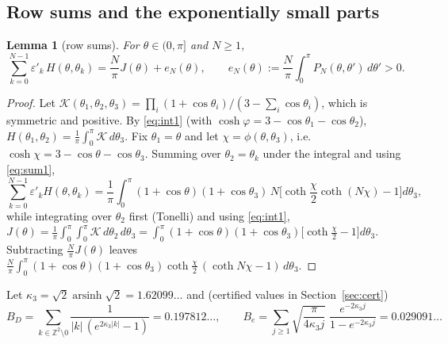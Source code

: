 \documentclass[11pt,a4paper]{article}
\newcommand{\Z}{\mathbb Z}
\theoremstyle{plain}
\newtheorem{lemma}[theorem]{Lemma}
\theoremstyle{definition}
\numberwithin{equation}{section}
\begin{document}
\subsection{Row sums and the exponentially small parts}

\begin{lemma}[row sums]\label{lem:rows}
For $\theta\in(0,\pi]$ and $N\ge1$,
\[
\sum_{k=0}^{N-1}\varepsilon'_k\,H(\theta,\theta_k)=\frac N\pi J(\theta)+e_N(\theta),\qquad e_N(\theta):=\frac N\pi\int_0^\pi P_N(\theta,\theta')\,d\theta'>0 .
\]
\end{lemma}
\begin{proof}
Let $\mathcal K(\theta_1,\theta_2,\theta_3)=\prod_i(1+\cos\theta_i)/(3-\sum_i\cos\theta_i)$, which is symmetric and positive. By \eqref{eq:int1} (with $\cosh\varphi=3-\cos\theta_1-\cos\theta_2$), $H(\theta_1,\theta_2)=\frac1\pi\int_0^\pi\mathcal K\,d\theta_3$. Fix $\theta_1=\theta$ and let $\chi=\phi(\theta,\theta_3)$, i.e.\ $\cosh\chi=3-\cos\theta-\cos\theta_3$. Summing over $\theta_2=\theta_k$ under the integral and using \eqref{eq:sum1},
\[
\sum_{k=0}^{N-1}\varepsilon'_kH(\theta,\theta_k)=\frac1\pi\int_0^\pi(1+\cos\theta)(1+\cos\theta_3)\,N\Big[\coth\frac\chi2\coth(N\chi)-1\Big]d\theta_3 ,
\]
while integrating over $\theta_2$ first (Tonelli) and using \eqref{eq:int1},
$J(\theta)=\frac1\pi\int_0^\pi\!\!\int_0^\pi\mathcal K\,d\theta_2\,d\theta_3=\int_0^\pi(1+\cos\theta)(1+\cos\theta_3)\big[\coth\frac\chi2-1\big]d\theta_3$. Subtracting $\frac N\pi J(\theta)$ leaves $\frac N\pi\int_0^\pi(1+\cos\theta)(1+\cos\theta_3)\coth\frac\chi2\,(\coth N\chi-1)\,d\theta_3$.
\end{proof}

Let $\kappa_3=\sqrt2\operatorname{arsinh}\sqrt2=1.62099\ldots$ and (certified values in Section~\ref{sec:cert})
\[
B_D=\sum_{k\in\Z^2\setminus0}\frac{1}{|k|\,(e^{2\kappa_3|k|}-1)}=0.197812\ldots,\qquad
B_e=\sum_{j\ge1}\sqrt{\frac{\pi}{4\kappa_3j}}\;\frac{e^{-2\kappa_3j}}{1-e^{-2\kappa_3j}}=0.029091\ldots
\]
\end{document}
